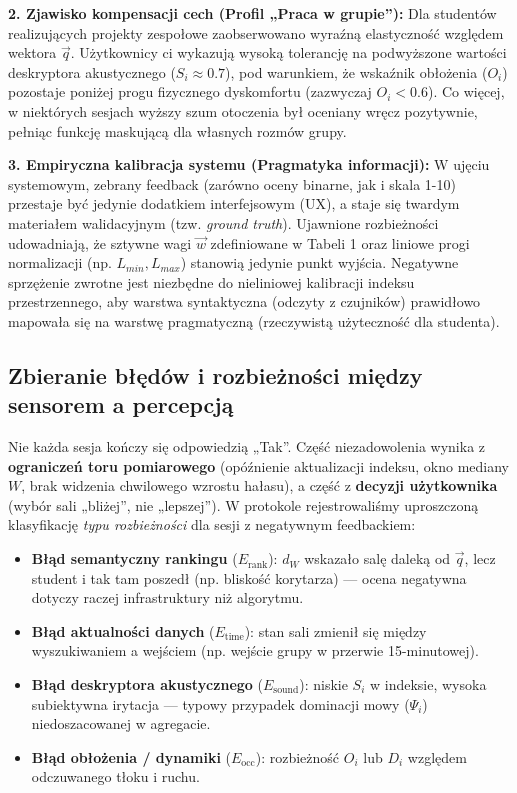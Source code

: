 \documentclass[14pt,a4paper]{extarticle}
\begin{document}
\textbf{2. Zjawisko kompensacji cech (Profil „Praca w grupie”):}
Dla studentów realizujących projekty zespołowe zaobserwowano wyraźną elastyczność względem wektora $\vec{q}$. Użytkownicy ci wykazują wysoką tolerancję na podwyższone wartości deskryptora akustycznego ($S_i \approx 0.7$), pod warunkiem, że wskaźnik obłożenia ($O_i$) pozostaje poniżej progu fizycznego dyskomfortu (zazwyczaj $O_i < 0.6$). Co więcej, w niektórych sesjach wyższy szum otoczenia był oceniany wręcz pozytywnie, pełniąc funkcję maskującą dla własnych rozmów grupy.

\textbf{3. Empiryczna kalibracja systemu (Pragmatyka informacji):}
W ujęciu systemowym, zebrany feedback (zarówno oceny binarne, jak i skala 1-10) przestaje być jedynie dodatkiem interfejsowym (UX), a staje się twardym materiałem walidacyjnym (tzw. \textit{ground truth}). Ujawnione rozbieżności udowadniają, że sztywne wagi $\vec{w}$ zdefiniowane w Tabeli 1 oraz liniowe progi normalizacji (np. $L_{min}, L_{max}$) stanowią jedynie punkt wyjścia. Negatywne sprzężenie zwrotne jest niezbędne do nieliniowej kalibracji indeksu przestrzennego, aby warstwa syntaktyczna (odczyty z czujników) prawidłowo mapowała się na warstwę pragmatyczną (rzeczywistą użyteczność dla studenta).

\subsection{Zbieranie błędów i rozbieżności między sensorem a percepcją}
Nie każda sesja kończy się odpowiedzią „Tak”. Część niezadowolenia wynika z \textbf{ograniczeń toru pomiarowego} (opóźnienie aktualizacji indeksu, okno mediany $W$, brak widzenia chwilowego wzrostu hałasu), a część z \textbf{decyzji użytkownika} (wybór sali „bliżej”, nie „lepszej”). W protokole rejestrowaliśmy uproszczoną klasyfikację \emph{typu rozbieżności} dla sesji z negatywnym feedbackiem:

\begin{itemize}
    \item \textbf{Błąd semantyczny rankingu} ($E_{\text{rank}}$): $d_W$ wskazało salę daleką od $\vec{q}$, lecz student i tak tam poszedł (np. bliskość korytarza) --- ocena negatywna dotyczy raczej infrastruktury niż algorytmu.
    \item \textbf{Błąd aktualności danych} ($E_{\text{time}}$): stan sali zmienił się między wyszukiwaniem a wejściem (np. wejście grupy w przerwie 15-minutowej).
    \item \textbf{Błąd deskryptora akustycznego} ($E_{\text{sound}}$): niskie $S_i$ w indeksie, wysoka subiektywna irytacja --- typowy przypadek dominacji mowy ($\Psi_i$) niedoszacowanej w agregacie.
    \item \textbf{Błąd obłożenia / dynamiki} ($E_{\text{occ}}$): rozbieżność $O_i$ lub $D_i$ względem odczuwanego tłoku i ruchu.
\end{itemize}
\end{document}
